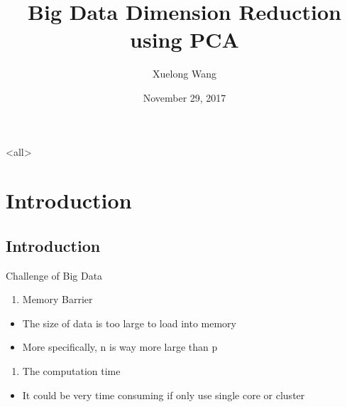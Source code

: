 \documentclass[ignorenonframetext,]{beamer}
\author[
Xuelong Wang
]{Xuelong Wang}
\date[
11/29/2017
]{
November 29, 2017
}
\providecommand{\tightlist}{%
  \setlength{\itemsep}{0pt}\setlength{\parskip}{0pt}}
\begin{document}
\mode<all>{
\title[
PCA on Big Data
]{
Big Data Dimension Reduction using PCA
}
}
\mode*

\frame{\titlepage}

\begin{frame}
\tableofcontents[hideallsubsections]
\end{frame}

\section{Introduction}\label{introduction}

\subsection{Introduction}\label{introduction-1}

\begin{frame}{Challenge of Big Data}

\begin{enumerate}
\def\labelenumi{\arabic{enumi}.}
\tightlist
\item
  Memory Barrier\\
\end{enumerate}

\begin{itemize}
\tightlist
\item
  The size of data is too large to load into memory
\item
  More specifically, n is way more large than p
\end{itemize}

\begin{enumerate}
\def\labelenumi{\arabic{enumi}.}
\setcounter{enumi}{1}
\tightlist
\item
  The computation time\\
\end{enumerate}

\begin{itemize}
\tightlist
\item
  It could be very time consuming if only use single core or cluster
\end{itemize}

\end{frame}
\end{document}
